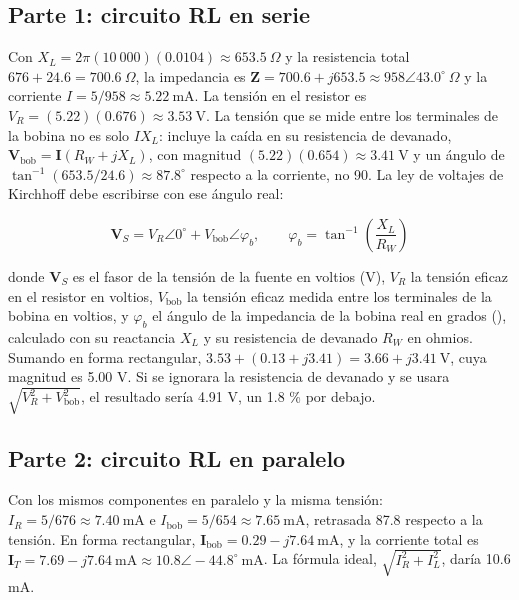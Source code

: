 \documentclass[11pt,letterpaper]{article}
\begin{document}
\subsection{Parte 1: circuito RL en serie}

Con $X_L = 2\pi(10\ 000)(0.0104) \approx 653.5\ \Omega$ y la resistencia total $676 + 24.6 = 700.6\ \Omega$, la impedancia es $\mathbf{Z} = 700.6 + j653.5 \approx 958 \angle 43.0^\circ\ \Omega$ y la corriente $I = 5/958 \approx 5.22\ \text{mA}$. La tensión en el resistor es $V_R = (5.22)(0.676) \approx 3.53\ \text{V}$. La tensión que se mide entre los terminales de la bobina no es solo $I X_L$: incluye la caída en su resistencia de devanado, $\mathbf{V}_{\mathrm{bob}} = \mathbf{I}(R_W + jX_L)$, con magnitud $(5.22)(0.654) \approx 3.41\ \text{V}$ y un ángulo de $\tan^{-1}(653.5/24.6) \approx 87.8^\circ$ respecto a la corriente, no 90\textdegree{}. La ley de voltajes de Kirchhoff debe escribirse con ese ángulo real:

\begin{equation}
  \mathbf{V}_S = V_R\angle 0^\circ + V_{\mathrm{bob}}\angle \varphi_b, \qquad \varphi_b = \tan^{-1}\!\left(\frac{X_L}{R_W}\right)
\end{equation}

donde $\mathbf{V}_S$ es el fasor de la tensión de la fuente en voltios (V), $V_R$ la tensión eficaz en el resistor en voltios, $V_{\mathrm{bob}}$ la tensión eficaz medida entre los terminales de la bobina en voltios, y $\varphi_b$ el ángulo de la impedancia de la bobina real en grados (\textdegree{}), calculado con su reactancia $X_L$ y su resistencia de devanado $R_W$ en ohmios. Sumando en forma rectangular, $3.53 + (0.13 + j3.41) = 3.66 + j3.41\ \text{V}$, cuya magnitud es 5.00 V. Si se ignorara la resistencia de devanado y se usara $\sqrt{V_R^2 + V_{\mathrm{bob}}^2}$, el resultado sería 4.91 V, un 1.8 \% por debajo.

\subsection{Parte 2: circuito RL en paralelo}

Con los mismos componentes en paralelo y la misma tensión: $I_R = 5/676 \approx 7.40\ \text{mA}$ e $I_{\mathrm{bob}} = 5/654 \approx 7.65\ \text{mA}$, retrasada 87.8\textdegree{} respecto a la tensión. En forma rectangular, $\mathbf{I}_{\mathrm{bob}} = 0.29 - j7.64\ \text{mA}$, y la corriente total es $\mathbf{I}_T = 7.69 - j7.64\ \text{mA} \approx 10.8 \angle -44.8^\circ\ \text{mA}$. La fórmula ideal, $\sqrt{I_R^2 + I_L^2}$, daría 10.6 mA.
\end{document}
